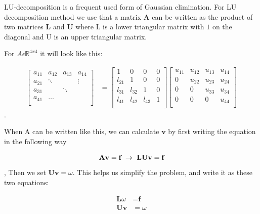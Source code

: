 \documentclass[a4paper,norsk,12pt,oneside]{article}
\begin{document}
LU-decomposition is a frequent used form of Gaussian elimination. 
For LU decomposition method we use that a matrix \(\textbf{A}\)
can be written as the product of two matrices \(\textbf{L}\) and \(\textbf{U}\) where
L is a lower triangular matrix with \(1\) on the diagonal and U is an upper triangular matrix.

For \(A \epsilon \mathbb{R}^{4x4}\) it will look like this:

\begin{align}\label{}
	\begin{bmatrix}
        a_{11} & a_{12} & a_{13} & a_{14} \\
        a_{21} & \ddots & & \vdots \\
        a_{31} &  & \ddots &  \\
        a_{41} & \hdots & & \\ 
	\end{bmatrix} &= \begin{bmatrix}
	    1 & 0 & 0 & 0 \\
        l_{21} & 1 & 0 & 0 \\
        l_{31} & l_{32}  & 1 & 0 \\
        l_{41} & l_{42} & l_{43} & 1 \\   
	\end{bmatrix} \begin{bmatrix}
        u_{11} & u_{12} & u_{13} & u_{14} \\
        0 & u_{22} & u_{23} & u_{24} \\
        0 & 0 & u_{33} & u_{34} \\
        0 & 0 & 0 & u_{44} \\  
	\end{bmatrix}
\end{align}.   


When A can be written like this, we can calculate \(\textbf{v}\) by first writing the 
equation in the following way

\begin{equation*}
    \textbf{A}\textbf{v} = \textbf{f} \ \rightarrow \ \textbf{L}\textbf{U}\textbf{v} = \textbf{f}\\
\end{equation*},
Then we set \(\textbf{U}\textbf{v} = \omega\). 
This helps us simplify the problem, and write it as these two equations: 


\begin{align*}
    \textbf{L} \omega &= \textbf{f}\\
    \textbf{U} \textbf{v} &= \omega
\end{align*}  
\end{document}
